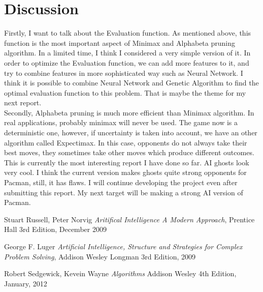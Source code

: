 \documentclass[a4paper, 11pt]{article}
\begin{document}
\section{Discussion}
Firstly, I want to talk about the Evaluation function. As mentioned above, this function is the most important aspect of Minimax and Alphabeta pruning algorithm. In a limited time, I think I considered a very simple version of it. In order to optimize the Evaluation function, we can add more features to it, and try to combine features in more sophisticated way such as Neural Network. I think it is possible to combine Neural Network and Genetic Algorithm to find the optimal evaluation function to this problem. That is maybe the theme for my next report. \\
Secondly, Alphabeta pruning is much more efficient than Minimax algorithm. In real applications, probably minimax will never be used. The game now is a deterministic one, however, if uncertainty is taken into account, we have an other algorithm called Expectimax. In this case, opponents do not always take their best moves, they sometimes take other moves which produce different outcomes. \\
This is currently the most interesting report I have done so far. AI ghosts look very cool. I think the current version makes ghosts quite strong opponents for Pacman, still, it has flaws. I will continue developing the project even after submitting this report. My next target will be making a strong AI version of Pacman.
\begin{thebibliography}{9}
  \label{itm:AIMA}
  Stuart Russell, Peter Norvig
  \emph{  Aritifical Intelligence A Modern Approach},
  Prentice Hall
  3rd Edition,
  December 2009

  \label{itm:SSCPS}
  George F. Luger
  \emph{Artificial Intelligence, Structure and Strategies for Complex Problem Solving},
  Addison Wesley Longman
  3rd Edition,
  2009
  
  \label{itm:algorithm}
  Robert Sedgewick, Kevein Wayne
  \emph{ Algorithms}
  Addison Wesley
  4th Edition,
  January, 2012

\end{thebibliography}
\end{document}
